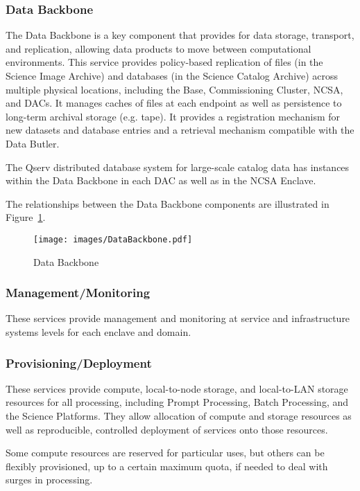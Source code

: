 \documentclass[DM,toc]{lsstdoc}
\begin{document}
\subsubsection{Data Backbone}\label{data-backbone}

The Data Backbone is a key component that provides for data storage,
transport, and replication, allowing data products to move between
computational environments. This service provides policy-based
replication of files (in the Science Image Archive) and databases (in
the Science Catalog Archive) across multiple physical locations,
including the Base, Commissioning Cluster, NCSA, and DACs. It manages
caches of files at each endpoint as well as persistence to long-term
archival storage (e.g. tape). It provides a registration mechanism for
new datasets and database entries and a retrieval mechanism compatible
with the Data Butler.

The Qserv distributed database system for large-scale catalog data has
instances within the Data Backbone in each DAC as well as in the NCSA
Enclave.

The relationships between the Data Backbone components are illustrated
in Figure~\ref{fig:dbb}.

\begin{figure}
\centering
\texttt{[image: images/DataBackbone.pdf]}
\caption{Data Backbone}
\label{fig:dbb}
\end{figure}

\subsubsection{Management/Monitoring}\label{managementmonitoring}

These services provide management and monitoring at service and
infrastructure systems levels for each enclave and domain.

\subsubsection{Provisioning/Deployment}\label{provisioningdeployment}

These services provide compute, local-to-node storage, and local-to-LAN
storage resources for all processing, including Prompt Processing, Batch
Processing, and the Science Platforms. They allow allocation of compute
and storage resources as well as reproducible, controlled deployment of
services onto those resources.

Some compute resources are reserved for particular uses, but others can
be flexibly provisioned, up to a certain maximum quota, if needed to
deal with surges in processing.
\end{document}
